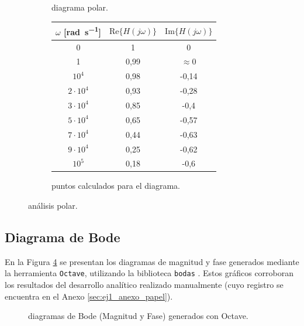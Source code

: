 \begin{figure}[!ht]
    \centering
    \begin{subfigure}[c]{0.45\textwidth}
        \centering
        \resizebox{\textwidth}{!}{
            
        }
        \caption{diagrama polar.}
        \label{fig:ej1_polar_hand}
    \end{subfigure}
    \hfill
    \begin{subfigure}[c]{0.45\textwidth}
        \centering
        \begin{tabular}{|c|c|c|}
            \hline
            $\omega$ [\si{\radian\per\second}] & $\text{Re}\{H(j\omega)\}$ & $\text{Im}\{H(j\omega)\}$ \\ \hline
            0 & 1 & 0 \\ \hline
            1 & 0,99 & $\approx 0$ \\ \hline
            $10^4$ & 0,98 & -0,14 \\ \hline
            $2 \cdot 10^4$ & 0,93 & -0,28 \\ \hline
            $3 \cdot 10^4$ & 0,85 & -0,4 \\ \hline
            $5 \cdot 10^4$ & 0,65 & -0,57 \\ \hline
            $7 \cdot 10^4$ & 0,44 & -0,63 \\ \hline
            $9 \cdot 10^4$ & 0,25 & -0,62 \\ \hline
            $10^5$ & 0,18 & -0,6 \\ \hline
        \end{tabular}
        \caption{puntos calculados para el diagrama.}
        \label{tab:ej1_puntos_polar}
    \end{subfigure}
    \caption{análisis polar.}
\end{figure}

\subsection{Diagrama de Bode}

En la Figura \ref{fig:ej1_bode_octave} se presentan los diagramas de magnitud y fase generados mediante la herramienta
\texttt{Octave}, utilizando la biblioteca \texttt{bodas} \cite{bodas}. Estos gráficos corroboran los resultados
del desarrollo analítico realizado manualmente (cuyo registro se encuentra en el Anexo \ref{sec:ej1_anexo_papel}).

\begin{figure}[!ht]
    \centering
    \begin{subfigure}[t]{\textwidth}
        \centering
        \resizebox{\textwidth}{!}{%
        }
    \end{subfigure}
    \begin{subfigure}[t]{\textwidth}
        \centering
        \vspace{-0.5cm}
        \resizebox{\textwidth}{!}{%
        }
    \end{subfigure}
    \caption{diagramas de Bode (Magnitud y Fase) generados con Octave.}
    \label{fig:ej1_bode_octave}
\end{figure}


